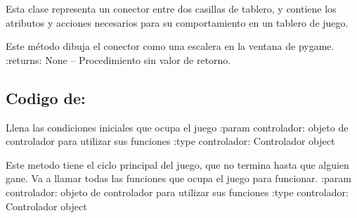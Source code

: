\documentclass[letterpaper,10pt,english]{sphinxmanual}
\begin{document}
\begin{fulllineitems}
\label{\detokenize{codigo:conector.Serpiente}}
Esta clase representa un conector entre dos casillas de tablero, y contiene los
atributos y acciones necesarios para su comportamiento en un tablero de juego.

\begin{fulllineitems}
\label{\detokenize{codigo:conector.Serpiente.dibujar}}
Este método dibuja el conector como una escalera en la ventana de pygame.
:returns:  None -- Procedimiento sin valor de retorno.

\end{fulllineitems}


\end{fulllineitems}



\subsection{Codigo de: }
\label{\detokenize{codigo:module-controlador}}\label{\detokenize{codigo:codigo-de-controlador}}

\begin{fulllineitems}
\label{\detokenize{codigo:controlador.empezarCondicionesJuego}}
Llena las condiciones iniciales que ocupa el juego
:param controlador: objeto de controlador para utilizar sus funciones
:type controlador: Controlador object

\end{fulllineitems}


\begin{fulllineitems}
\label{\detokenize{codigo:controlador.juego}}
Este metodo tiene el ciclo principal del juego, que no termina hasta que alguien gane.
Va a llamar todas las funciones que ocupa el juego para funcionar.
:param controlador: objeto de controlador para utilizar sus funciones
:type controlador: Controlador object

\end{fulllineitems}
\end{document}
